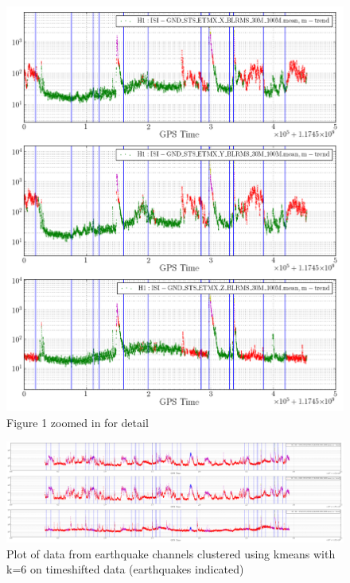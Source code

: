 \documentclass[colorlinks=true,pdfstartview=FitV,linkcolor=blue,
            citecolor=red,urlcolor=magenta]{ligodoc}
\begin{document}
\begin{figure}[htbp]
\begin{center}
\includegraphics[scale = 0.5]{EQdata2_Kmeans_6_crop.png}
\caption{Figure 1 zoomed in for detail}
\label{fig:image2}
\end{center}
\end{figure}

\begin{figure}[htbp]
\begin{center}
\includegraphics[width=1.3\textwidth,angle=90]{Timeshift_Kmeans_all6_.png}
\caption{Plot of data from earthquake channels clustered using kmeans with k=6 on timeshifted data (earthquakes indicated)}
\label{fig:image3}
\end{center}
\end{figure}
\end{document}
